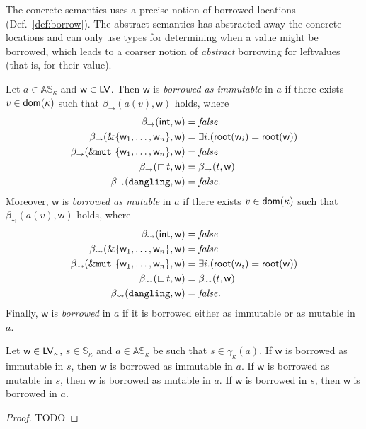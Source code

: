 The concrete semantics uses a precise notion of borrowed locations
(Def.~\ref{def:borrow}). The abstract semantics has abstracted away the concrete locations
and can only use types for determining when a value might be borrowed, which leads
to a coarser notion of \emph{abstract} borrowing for leftvalues (that is, for their value).

\begin{definition}\label{def:abstract_borrow}
  Let $a\in\mathbb{AS}_\kappa$ and $\mathsf{w}\in\mathsf{LV}$.
  Then $\mathsf{w}$ is
  \emph{borrowed as immutable} in $a$ if there exists $v\in\mathsf{dom}(\kappa)$ such that
  $\beta_\to(a(v),\mathsf{w})$ holds, where
  \begin{align*}
    \beta_\to(\mathsf{int},\mathsf{w})&=\mathit{false}\\
    \beta_\to(\&\{\mathsf{w}_1,\ldots,\mathsf{w}_n\},\mathsf{w})&=\exists i.(\mathsf{root}(\mathsf{w}_i)=\mathsf{root}(\mathsf{w}))\\
    \beta_\to(\&\mathtt{mut}\ \{\mathsf{w}_1,\ldots,\mathsf{w}_n\},\mathsf{w})&=\mathit{false}\\
    \beta_\to(\boxempty\,{t},\mathsf{w})&=\beta_\to(t,\mathsf{w})\\
    \beta_\to(\mathtt{dangling},\mathsf{w})&=\mathit{false.}
  \end{align*}
  Moreover, $\mathsf{w}$ is
  \emph{borrowed as mutable} in $a$ if there exists $v\in\mathsf{dom}(\kappa)$ such that
  $\beta_\leadsto(a(v),\mathsf{w})$ holds, where
  \begin{align*}
    \beta_\leadsto(\mathsf{int},\mathsf{w})&=\mathit{false}\\
    \beta_\leadsto(\&\{\mathsf{w}_1,\ldots,\mathsf{w}_n\},\mathsf{w})&=\mathit{false}\\
    \beta_\leadsto(\&\mathtt{mut}\ \{\mathsf{w}_1,\ldots,\mathsf{w}_n\},\mathsf{w})&=\exists i.(\mathsf{root}(\mathsf{w}_i)=\mathsf{root}(\mathsf{w}))\\
    \beta_\leadsto(\boxempty\,{t},\mathsf{w})&=\beta_\leadsto(t,\mathsf{w})\\
    \beta_\leadsto(\mathtt{dangling},\mathsf{w})&=\mathit{false.}
  \end{align*}
  Finally, $\mathsf{w}$ is \emph{borrowed} in $a$ if it is borrowed either as immutable
  or as mutable in $a$.
\end{definition}

\begin{proposition}
  \label{prop:abstract_borrow_correctness}
  Let $\mathsf{w}\in\mathsf{LV}_\kappa$, $s\in\mathbb{S}_\kappa$
  and $a\in\mathbb{AS}_\kappa$ be
  such that $s\in\gamma_\kappa(a)$.
  If $\mathsf{w}$ is borrowed as immutable in $s$, then
  $\mathsf{w}$ is borrowed as immutable in $a$.
  If $\mathsf{w}$ is borrowed as mutable in $s$, then
  $\mathsf{w}$ is borrowed as mutable in $a$.
  If $\mathsf{w}$ is borrowed in $s$, then
  $\mathsf{w}$ is borrowed in $a$.
\end{proposition}
\begin{proof}
  TODO
\end{proof}


